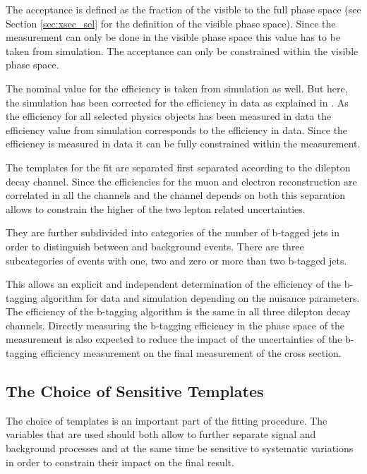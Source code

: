 The acceptance is defined as the fraction of the visible to the full phase space (see Section \ref{sec:xsec_sel} for the definition of the visible phase space).
Since the measurement can only be done in the visible phase space this value has to be taken from simulation. The acceptance can only be constrained within the visible phase space.

The nominal value for the efficiency is taken from simulation as well.  But here, the simulation has been corrected for the efficiency in data as explained in . 
As the efficiency for all selected physics objects has been measured in data the efficiency value from simulation corresponds to the efficiency in data.
Since the efficiency is measured in data it can be fully constrained within the measurement.

The templates for the fit are separated first separated according to the dilepton decay channel. Since the efficiencies for the muon and electron reconstruction are correlated in all the channels and the \emu channel depends on both this separation allows to constrain the higher of the two lepton related uncertainties.

They are further subdivided into categories of the number of b-tagged jets in order to distinguish between \ttbar and background events. There are three subcategories of events with one, two and zero or more than two b-tagged jets.

This allows an explicit and independent determination of the efficiency of the b-tagging algorithm for data and simulation depending on the nuisance parameters. The efficiency of the b-tagging algorithm is the same in all three dilepton decay channels.
Directly measuring the b-tagging efficiency in the phase space of the measurement is also expected to reduce the impact of the uncertainties of the b-tagging efficiency measurement on the final measurement of the \ttbar cross section.


\subsection{The Choice of Sensitive Templates}
\label{sec:xsec_templates}

The choice of templates is an important part of the fitting procedure.
The variables that are used should both allow to further separate signal and background processes and at the same time be sensitive to systematic
variations in order to constrain their impact on the final result.

